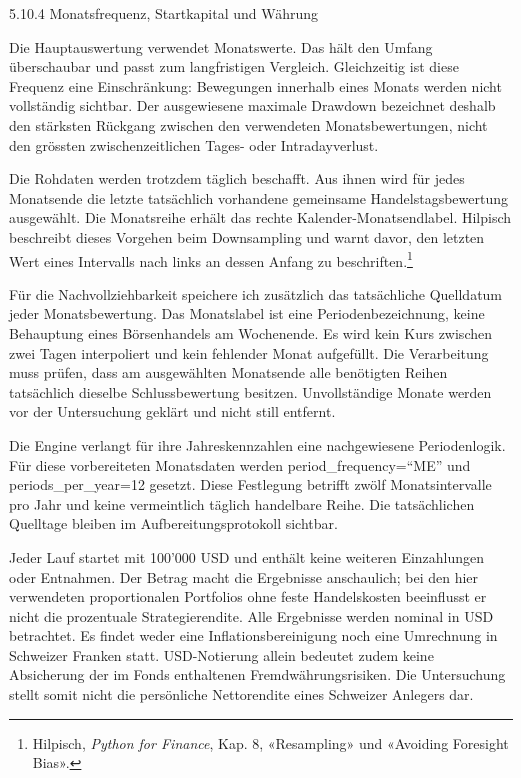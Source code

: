 \documentclass[
  ngerman,
  a4paper,
  DIV=11,
  oneside]{scrreprt}
\begin{document}
5.10.4 Monatsfrequenz, Startkapital und Währung

Die Hauptauswertung verwendet Monatswerte. Das hält den Umfang
überschaubar und passt zum langfristigen Vergleich. Gleichzeitig ist
diese Frequenz eine Einschränkung: Bewegungen innerhalb eines Monats
werden nicht vollständig sichtbar. Der ausgewiesene maximale Drawdown
bezeichnet deshalb den stärksten Rückgang zwischen den verwendeten
Monatsbewertungen, nicht den grössten zwischenzeitlichen Tages- oder
Intradayverlust.

Die Rohdaten werden trotzdem täglich beschafft. Aus ihnen wird für jedes
Monatsende die letzte tatsächlich vorhandene gemeinsame
Handelstagsbewertung ausgewählt. Die Monatsreihe erhält das rechte
Kalender-Monatsendlabel. Hilpisch beschreibt dieses Vorgehen beim
Downsampling und warnt davor, den letzten Wert eines Intervalls nach
links an dessen Anfang zu beschriften.\footnote{Hilpisch, \emph{Python
  for Finance}, Kap. 8, «Resampling» und «Avoiding Foresight Bias».}

Für die Nachvollziehbarkeit speichere ich zusätzlich das tatsächliche
Quelldatum jeder Monatsbewertung. Das Monatslabel ist eine
Periodenbezeichnung, keine Behauptung eines Börsenhandels am Wochenende.
Es wird kein Kurs zwischen zwei Tagen interpoliert und kein fehlender
Monat aufgefüllt. Die Verarbeitung muss prüfen, dass am ausgewählten
Monatsende alle benötigten Reihen tatsächlich dieselbe Schlussbewertung
besitzen. Unvollständige Monate werden vor der Untersuchung geklärt und
nicht still entfernt.

Die Engine verlangt für ihre Jahreskennzahlen eine nachgewiesene
Periodenlogik. Für diese vorbereiteten Monatsdaten werden
period\_frequency=``ME'' und periods\_per\_year=12 gesetzt. Diese
Festlegung betrifft zwölf Monatsintervalle pro Jahr und keine
vermeintlich täglich handelbare Reihe. Die tatsächlichen Quelltage
bleiben im Aufbereitungsprotokoll sichtbar.

Jeder Lauf startet mit 100'000 USD und enthält keine weiteren
Einzahlungen oder Entnahmen. Der Betrag macht die Ergebnisse
anschaulich; bei den hier verwendeten proportionalen Portfolios ohne
feste Handelskosten beeinflusst er nicht die prozentuale
Strategierendite. Alle Ergebnisse werden nominal in USD betrachtet. Es
findet weder eine Inflationsbereinigung noch eine Umrechnung in
Schweizer Franken statt. USD-Notierung allein bedeutet zudem keine
Absicherung der im Fonds enthaltenen Fremdwährungsrisiken. Die
Untersuchung stellt somit nicht die persönliche Nettorendite eines
Schweizer Anlegers dar.
\end{document}
